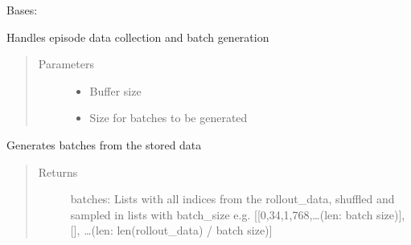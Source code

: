 \documentclass[letterpaper,10pt,english]{sphinxmanual}
\begin{document}
\begin{fulllineitems}
\label{\detokenize{agents.reinforcement_learning:agents.reinforcement_learning.ppo.RolloutBuffer}}
\sphinxAtStartPar
Bases: 

\sphinxAtStartPar
Handles episode data collection and batch generation
\begin{quote}\begin{description}
\item[{Parameters}] \leavevmode\begin{itemize}
\item {} 
\sphinxAtStartPar
{} \textendash{} Buffer size

\item {} 
\sphinxAtStartPar
{} \textendash{} Size for batches to be generated

\end{itemize}

\end{description}\end{quote}

\begin{fulllineitems}
\label{\detokenize{agents.reinforcement_learning:agents.reinforcement_learning.ppo.RolloutBuffer.__init__}}
\end{fulllineitems}


\begin{fulllineitems}
\label{\detokenize{agents.reinforcement_learning:agents.reinforcement_learning.ppo.RolloutBuffer.generate_batches}}
\sphinxAtStartPar
Generates batches from the stored data
\begin{quote}\begin{description}
\item[{Returns}] \leavevmode
\sphinxAtStartPar
batches: Lists with all indices from the rollout\_data, shuffled and sampled in lists with batch\_size
e.g. {[}{[}0,34,1,768,…(len: batch size){]}, {[}{]}, …(len: len(rollout\_data) / batch size){]}


\end{description}
\end{quote}
\end{fulllineitems}
\end{fulllineitems}
\end{document}

